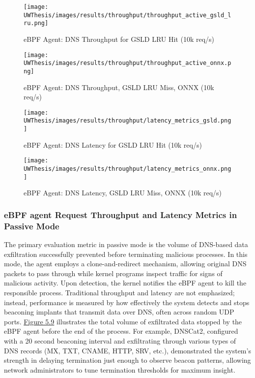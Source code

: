 \documentclass [11pt, proquest] {uwthesis}[2020/02/24]
\begin{document}
\begin{figure}[H]
  \centering
  \begin{minipage}[t]{0.47\textwidth}
    \centering
    \texttt{[image: UWThesis/images/results/throughput/throughput\_active\_gsld\_lru.png]}
    \caption{eBPF Agent: DNS Throughput for GSLD LRU Hit (10k req/s)}
    \label{fig:throughput_gsld}
  \end{minipage}
  \hfill
  \begin{minipage}[t]{0.47\textwidth}
    \centering
    \texttt{[image: UWThesis/images/results/throughput/throughput\_active\_onnx.png]}
    \caption{eBPF Agent: DNS Throughput, GSLD LRU Miss, ONNX (10k req/s)}
    \label{fig:throughput_onnx}
  \end{minipage}

  \vspace{1cm} %

  \begin{minipage}[t]{0.47\textwidth}
    \centering
    \texttt{[image: UWThesis/images/results/throughput/latency\_metrics\_gsld.png]}
    \caption{eBPF Agent: DNS Latency for GSLD LRU Hit (10k req/s)}
    \label{fig:latency_gsld}
  \end{minipage}
  \hfill
  \begin{minipage}[t]{0.47\textwidth}
    \centering
    \texttt{[image: UWThesis/images/results/throughput/latency\_metrics\_onnx.png]}
    \caption{eBPF Agent: DNS Latency, GSLD LRU Miss, ONNX (10k req/s)}
    \label{fig:latency_onnx}
  \end{minipage}
\end{figure}

\subsubsection{eBPF agent Request Throughput and Latency Metrics in Passive Mode}
The primary evaluation metric in passive mode is the volume of DNS-based data exfiltration successfully prevented before terminating malicious processes. In this mode, the agent employs a clone-and-redirect mechanism, allowing original DNS packets to pass through while kernel programs inspect traffic for signs of malicious activity. Upon detection, the kernel notifies the eBPF agent to kill the responsible process. Traditional throughput and latency are not emphasized; instead, performance is measured by how effectively the system detects and stops beaconing implants that transmit data over DNS, often across random UDP ports. \hyperref[fig:data_loss_prev]{Figure 5.9} illustrates the total volume of exfiltrated data stopped by the eBPF agent before the end of the process. For example, DNSCat2, configured with a 20 second beaconing interval and exfiltrating through various types of DNS records (MX, TXT, CNAME, HTTP, SRV, etc.), demonstrated the system’s strength in delaying termination just enough to observe beacon patterns, allowing network administrators to tune termination thresholds for maximum insight.
\end{document}
